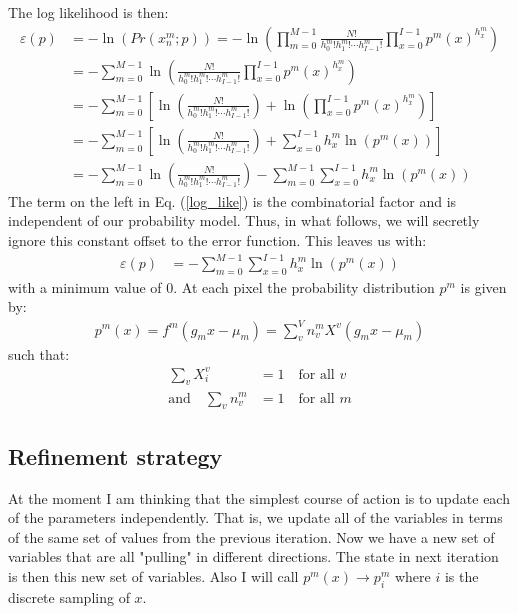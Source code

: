 \documentclass[11pt]{article}
\begin{document}
The log likelihood is then:
\begin{align}
   \varepsilon(p) &= -\ln(Pr(x^m_n; p)) = -\ln\left(\prod_{m=0}^{M-1}\frac{N!}{h^m_0! h^m_1! \cdots h^m_{I-1}!} \prod_{x=0}^{I-1} p^m(x)^{h^m_{x}}\right) \\
   &= -\sum_{m=0}^{M-1}\ln\left(\frac{N!}{h^m_0! h^m_1! \cdots h^m_{I-1}!} \prod_{x=0}^{I-1} p^m(x)^{h^m_{x}}\right) \\
   &= -\sum_{m=0}^{M-1}\left[\ln\left(\frac{N!}{h^m_0! h^m_1! \cdots h^m_{I-1}!}\right) +\ln\left(\prod_{x=0}^{I-1} p^m(x)^{h^m_{x}}\right) \right]\\
   &= -\sum_{m=0}^{M-1}\left[\ln\left(\frac{N!}{h^m_0! h^m_1! \cdots h^m_{I-1}!}\right) +\sum_{x=0}^{I-1} h^m_x \ln\left(p^m(x)\right) \right]\\
   &= -\sum_{m=0}^{M-1}\ln\left(\frac{N!}{h^m_0! h^m_1! \cdots h^m_{I-1}!}\right) -\sum_{m=0}^{M-1} \sum_{x=0}^{I-1} h^m_x \ln\left(p^m(x)\right) 
   \label{log_like}
\end{align}
The term on the left in Eq. (\ref{log_like}) is the combinatorial factor and is independent of our probability model. Thus, in what follows, we will secretly ignore this constant offset to the error function. This leaves us with:
\begin{align}
   \varepsilon(p) &= -\sum_{m=0}^{M-1} \sum_{x=0}^{I-1} h^m_x \ln\left(p^m(x)\right) 
   \label{log_like}
\end{align}
with a minimum value of 0. 
At each pixel the probability distribution $p^m$ is given by:
\begin{align}
   p^m(x) = f^m(g_m x - \mu_m) = \sum_v^V n^m_v X^v(g_m x - \mu_m)
\end{align}
such that:
\begin{align}
   \sum_v X^v_i &= 1 \quad \text{for all } v \\
   \text{and} \quad \sum_v n^m_v &= 1  \quad \text{for all } m 
\end{align}



















\subsection{Refinement strategy}
At the moment I am thinking that the simplest course of action is to update each of the parameters independently. That is, we update all of the variables in terms of the same set of values from the previous iteration. Now we have a new set of variables that are all "pulling" in different directions. The state in next iteration is then this new set of variables. Also I will call $p^m(x) \rightarrow p^m_i$ where $i$ is the discrete sampling of $x$. 
\end{document}
